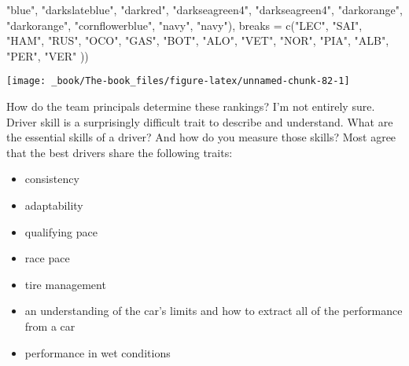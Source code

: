 \documentclass[
]{book}
\newenvironment{Shaded}{\begin{snugshade}}{\end{snugshade}}
\newcommand{\AttributeTok}[1]{\textcolor[rgb]{0.77,0.63,0.00}{#1}}
\newcommand{\FunctionTok}[1]{\textcolor[rgb]{0.00,0.00,0.00}{#1}}
\newcommand{\NormalTok}[1]{#1}
\newcommand{\StringTok}[1]{\textcolor[rgb]{0.31,0.60,0.02}{#1}}
\providecommand{\tightlist}{%
  \setlength{\itemsep}{0pt}\setlength{\parskip}{0pt}}
\begin{document}
\begin{Shaded}
\begin{Highlighting}[]
                                \StringTok{"blue"}\NormalTok{,}
                                \StringTok{"darkslateblue"}\NormalTok{,}
                                \StringTok{"darkred"}\NormalTok{,}
                                \StringTok{"darkseagreen4"}\NormalTok{, }\StringTok{"darkseagreen4"}\NormalTok{,}
                                \StringTok{"darkorange"}\NormalTok{, }\StringTok{"darkorange"}\NormalTok{,}
                                \StringTok{"cornflowerblue"}\NormalTok{, }
                                \StringTok{"navy"}\NormalTok{, }\StringTok{"navy"}\NormalTok{),}
                     \AttributeTok{breaks =} \FunctionTok{c}\NormalTok{(}\StringTok{"LEC"}\NormalTok{, }\StringTok{"SAI"}\NormalTok{,}
                                \StringTok{"HAM"}\NormalTok{, }\StringTok{"RUS"}\NormalTok{, }
                                \StringTok{"OCO"}\NormalTok{, }
                                \StringTok{"GAS"}\NormalTok{,  }
                                \StringTok{"BOT"}\NormalTok{,}
                                \StringTok{"ALO"}\NormalTok{, }\StringTok{"VET"}\NormalTok{,}
                                \StringTok{"NOR"}\NormalTok{, }\StringTok{"PIA"}\NormalTok{,}
                                \StringTok{"ALB"}\NormalTok{,}
                                \StringTok{"PER"}\NormalTok{, }\StringTok{"VER"}
\NormalTok{                                ))}
\end{Highlighting}
\end{Shaded}

\begin{center}\texttt{[image: \_book/The-book\_files/figure-latex/unnamed-chunk-82-1]} \end{center}

How do the team principals determine these rankings? I'm not entirely sure. Driver skill is a surprisingly difficult trait to describe and understand. What are the essential skills of a driver? And how do you measure those skills? Most agree that the best drivers share the following traits:

\begin{itemize}
\tightlist
\item
  consistency
\item
  adaptability
\item
  qualifying pace
\item
  race pace
\item
  tire management
\item
  an understanding of the car's limits and how to extract all of the performance from a car
\item
  performance in wet conditions
\end{itemize}
\end{document}

